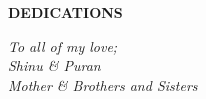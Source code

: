 \begin{center}
{\normalsize \bf DEDICATIONS}
\end{center}

\thispagestyle{empty}
\vspace{2cm}
\begin{center}

\it{To all of my love;\\
	Shinu \& Puran\\
	Mother \& Brothers and Sisters\\ 

	
}
\end{center}
